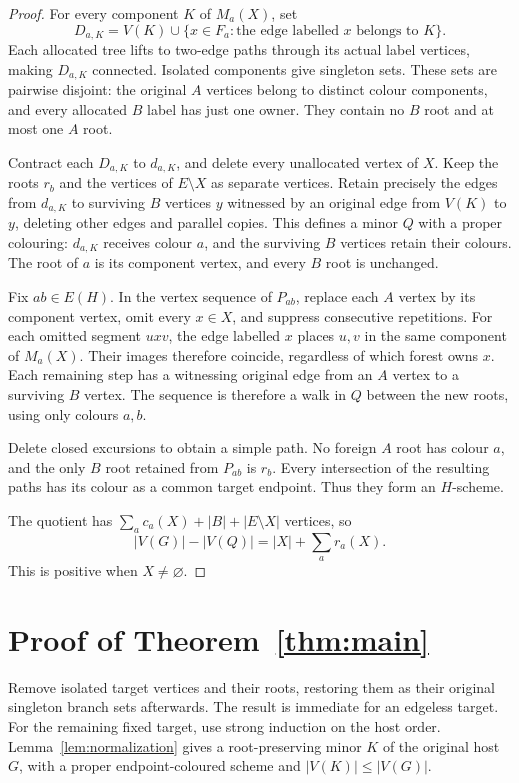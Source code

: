 \documentclass[11pt]{amsart}
\begin{document}
\begin{proof}
For every component $K$ of $M_a(X)$, set
\[
 D_{a,K}=V(K)\cup
 \{x\in F_a:\text{the edge labelled }x\text{ belongs to }K\}.
\]
Each allocated tree lifts to two-edge paths through its actual label
vertices, making $D_{a,K}$ connected. Isolated components give singleton
sets. These sets are pairwise disjoint: the original $A$ vertices belong
to distinct colour components, and every allocated $B$ label has just
one owner. They contain no $B$ root and at most one $A$ root.

Contract each $D_{a,K}$ to $d_{a,K}$, and delete every unallocated
vertex of $X$. Keep the roots $r_b$ and the vertices of $E\setminus X$
as separate vertices. Retain precisely the edges from $d_{a,K}$ to
surviving $B$ vertices $y$ witnessed by an original edge from $V(K)$
to $y$, deleting other edges and parallel copies. This defines a minor
$Q$ with a proper colouring: $d_{a,K}$ receives colour $a$, and the
surviving $B$ vertices retain their colours. The root of $a$ is its
component vertex, and every $B$ root is unchanged.

Fix $ab\in E(H)$. In the vertex sequence of $P_{ab}$, replace each
$A$ vertex by its component vertex, omit every $x\in X$, and suppress
consecutive repetitions. For each omitted segment $u x v$, the edge
labelled $x$ places $u,v$ in the same component of $M_a(X)$. Their
images therefore coincide, regardless of which forest owns $x$.
Each remaining step has a witnessing original edge from an $A$ vertex
to a surviving $B$ vertex. The sequence is therefore a walk in $Q$ between
the new roots, using only colours $a,b$.

Delete closed excursions to obtain a simple path. No foreign $A$ root
has colour $a$, and the only $B$ root retained from $P_{ab}$ is $r_b$.
Every intersection of the resulting paths has its colour as a common
target endpoint. Thus they form an $H$-scheme.

The quotient has $\sum_a c_a(X)+|B|+|E\setminus X|$ vertices, so
\[
 |V(G)|-|V(Q)|=|X|+\sum_a r_a(X).
\]
This is positive when $X\ne\varnothing$.
\end{proof}

\section{Proof of Theorem~\ref{thm:main}}

Remove isolated target vertices and their roots, restoring them as their
original singleton branch sets afterwards. The result is immediate for
an edgeless target. For the remaining fixed target, use strong induction
on the host order. Lemma~\ref{lem:normalization} gives a root-preserving minor
$K$ of the original host $G$, with a proper endpoint-coloured scheme and
$|V(K)|\leq|V(G)|$.
\end{document}
